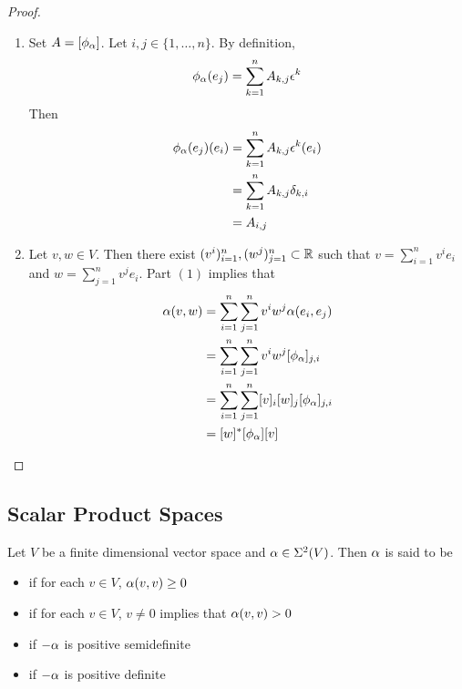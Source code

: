 \documentclass{book}
\begin{document}
	\begin{proof}
		\begin{enumerate}
			\item Set $A = [\phi_{\alpha}]$. Let $i, j \in \{1, \ldots, n\}$. By definition,
			$$\phi_{\alpha}(e_j) = \sum\limits_{k =1}^n A_{k,j} \epsilon^{k}$$ 
			Then 
			\begin{align*}
				\phi_{\alpha}(e_j)(e_i)
				& = \sum\limits_{k =1}^n A_{k,j} \epsilon^{k}(e_i) \\
				& =  \sum\limits_{k =1}^n A_{k,j} \delta_{k,i} \\
				& =  A_{i,j} 
			\end{align*}
			\item Let $v, w \in V$. Then there exist $(v^i)_{i=1}^n, (w^j)_{j=1}^n \subset \mathbb{R}$ such that $v = \sum\limits_{i=1}^n v^i e_i$ and $w = \sum\limits_{j=1}^n v^j e_i$. Part $(1)$ implies that
			\begin{align*}
				\alpha(v, w)
				& = \sum_{i=1}^n \sum_{j=1}^n v^i w^j \alpha(e_i, e_j) \\
				& = \sum_{i=1}^n \sum_{j=1}^n v^i w^j [\phi_{\alpha}]_{j, i} \\
				& = \sum_{i=1}^n \sum_{j=1}^n [v]_i [w]_j [\phi_{\alpha}]_{j, i} \\
				& = [w]^* [\phi_{\alpha}] [v]
			\end{align*}
		\end{enumerate}
	\end{proof}


















	\subsection{Scalar Product Spaces}
	
	\begin{defn}
		Let $V$ be a finite dimensional vector space and $\alpha \in \Sigma^2(V)$. Then $\alpha$ is said to be 
		\begin{itemize}
			\item {} if for each $v \in V$, $\alpha(v, v) \geq 0$
			\item {} if for each $v \in V$, $v \neq 0$ implies that $\alpha(v, v) > 0$
			\item {} if $-\alpha$ is positive semidefinite
			\item {} if $-\alpha$ is positive definite
		\end{itemize}
	\end{defn}
\end{document}
